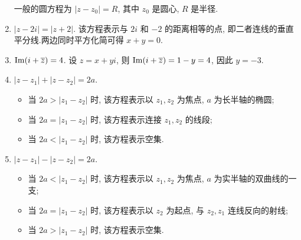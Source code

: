 \begin{example}
\begin{enumerate}
    一般的圆方程为 $|z-z_0|=R$, 其中 $z_0$ 是圆心, $R$ 是半径.
    \item $|z-2i|=|z+2|$. 该方程表示与 $2i$ 和 $-2$ 的距离相等的点, 即二者连线的垂直平分线.两边同时平方化简可得 $x+y=0$.
    \begin{center}
    \end{center}
    \item $\operatorname{Im}(i+\overline z)=4$. 设 $z=x+yi$, 则 $\operatorname{Im}(i+\overline z)=1-y=4$, 因此 $y=-3$.
    \item $|z-z_1|+|z-z_2|=2a$.
    \begin{itemize}
      \item 当 $2a>|z_1-z_2|$ 时, 该方程表示以 $z_1,z_2$ 为焦点, $a$ 为长半轴的椭圆;
      \item 当 $2a=|z_1-z_2|$ 时, 该方程表示连接 $z_1,z_2$ 的线段;
      \item 当 $2a<|z_1-z_2|$ 时, 该方程表示空集.
    \end{itemize}
    \item $|z-z_1|-|z-z_2|=2a$.
    \begin{itemize}
      \item 当 $2a<|z_1-z_2|$ 时, 该方程表示以 $z_1,z_2$ 为焦点, $a$ 为实半轴的双曲线的一支;
      \item 当 $2a=|z_1-z_2|$ 时, 该方程表示以 $z_2$ 为起点, 与 $z_2,z_1$ 连线反向的射线;
      \item 当 $2a>|z_1-z_2|$ 时, 该方程表示空集.
    \end{itemize}
  \end{enumerate}
\end{example}

